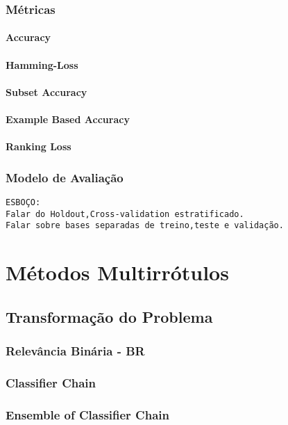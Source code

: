 \subsection{Métricas}
\label{sec:metrics}
\subsubsection{Accuracy}
\subsubsection{Hamming-Loss}
\subsubsection{Subset Accuracy}
\subsubsection{Example Based Accuracy}
\subsubsection{Ranking Loss}
\subsection{Modelo de Avaliação}
\label{sec:modelav}

\begin{verbatim}
ESBOÇO:
Falar do Holdout,Cross-validation estratificado.
Falar sobre bases separadas de treino,teste e validação.
\end{verbatim}

\chapter{Métodos Multirrótulos}
\section{Transformação do Problema}
\subsection{Relevância Binária - BR}
\label{sec:br}
\cite{br2010}
\subsection{Classifier Chain}
\cite{cc2009}
\subsection{Ensemble of Classifier Chain}
